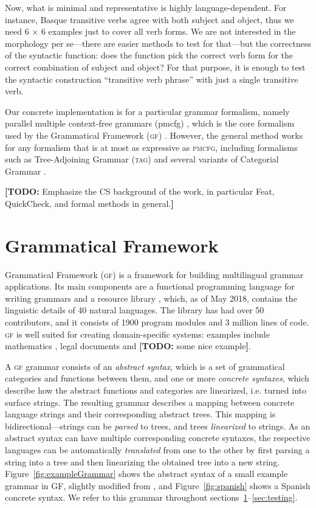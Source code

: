 \documentclass[11pt]{article}
\def\gf{\textsc{gf}}
\def\ccg{\textsc{ccg}}
\def\acg{\textsc{acg}}
\def\tag{\textsc{tag}}
\def\pmcfg{\textsc{pmcfg}}
\newcommand{\todo}[1]{{\color{cyan}\textbf{[TODO: }#1\textbf{]}}}
\begin{document}
Now, what is minimal and representative is highly language-dependent. 
For instance, Basque transitive verbs agree with both subject and
object, thus we need 6 $\times$ 6 examples just to cover all verb
forms. We are not interested in the morphology per se---there are
easier methods to test for that---but the correctness of the syntactic
function: does the function pick the correct verb form for the correct
combination of subject and object? For that purpose, it is enough to
test the syntactic construction ``transitive verb phrase'' with just a
single transitive verb.

Our concrete implementation is for a particular grammar formalism,
namely parallel multiple context-free grammars ({\sc pmcfg})
\cite{seki91pmcfg}, which is the core formalism used by the
Grammatical Framework (\gf) \cite{ranta2004gf}. However, the general
method works for any formalism that is at most as expressive as
\pmcfg{}, including formalisms such as Tree-Adjoining Grammar (\tag)
\cite{joshi1975tag} and several variants of Categorial Grammar
\cite{deGroote2004,steedman1988ccg}.

\todo{Emphasize the CS background of the work, in particular Feat,
  QuickCheck, and formal methods in general.}

\section{Grammatical Framework}
\label{sec:GF}

Grammatical Framework (\gf) \cite{ranta2004gf} 
is a framework for building multilingual grammar applications. Its main
components are a functional programming language for writing grammars
and a resource library \cite{ranta2009rgl}, which, as of May 2018,
contains the linguistic details of 40 natural languages. The library
has had over 50 contributors, and it consists of 1900 program modules and 3
million lines of code. \gf{} is well suited for creating
domain-specific systems: examples include mathematics
\cite{caprotti2006webalt}, legal documents \cite{camilleri2017} and
\todo{some nice example}.

A \gf{} grammar consists of an \emph{abstract syntax}, which is a set
of grammatical categories and functions between them, and one or more
\emph{concrete syntaxes}, which describe how the abstract functions
and categories are linearized, i.e. turned into surface strings. The
resulting grammar describes a mapping between concrete language
strings and their corresponding abstract trees. This mapping is
bidirectional---strings can be \emph{parsed} to trees, and trees
\emph{linearized} to strings. As an abstract syntax can have multiple
corresponding concrete syntaxes, the respective languages can be
automatically \emph{translated} from one to the other by first parsing
a string into a tree and then linearizing the obtained tree into a new
string. 
Figure~\ref{fig:exampleGrammar} shows the abstract syntax of a small
example grammar in GF, slightly modified from
\cite{ranta2011gfbook}, and Figure~\ref{fig:spanish} shows a Spanish concrete
syntax. We refer to this grammar throughout sections~\ref{sec:GF}--\ref{sec:testing}. 
\end{document}
